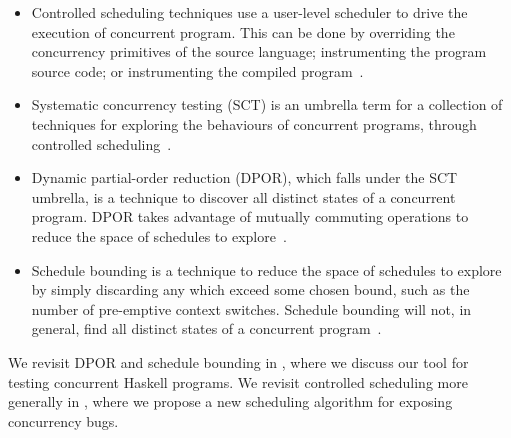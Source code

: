 \begin{itemize}
\item Controlled scheduling techniques use a user-level scheduler to
  drive the execution of concurrent program.  This can be done by
  overriding the concurrency primitives of the source language;
  instrumenting the program source code; or instrumenting the compiled
  program~.

\item Systematic concurrency testing (SCT) is an umbrella term for a
  collection of techniques for exploring the behaviours of concurrent
  programs, through controlled scheduling~.

\item Dynamic partial-order reduction (DPOR), which falls under the
  SCT umbrella, is a technique to discover all distinct states of a
  concurrent program.  DPOR takes advantage of mutually commuting
  operations to reduce the space of schedules to
  explore~.

\item Schedule bounding is a technique to reduce the space of
  schedules to explore by simply discarding any which exceed some
  chosen bound, such as the number of pre-emptive context switches.
  Schedule bounding will not, in general, find all distinct states of
  a concurrent program~.
\end{itemize}

We revisit DPOR and schedule bounding in , where we
discuss our tool for testing concurrent Haskell programs.  We revisit
controlled scheduling more generally in , where
we propose a new scheduling algorithm for exposing concurrency bugs.
